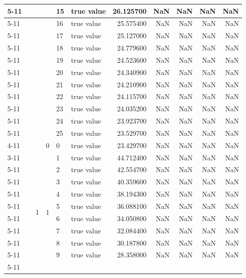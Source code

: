 \begin{tabular}{llllllrrrrr}
\cline{5-11}
 &  &  &  & 15 & true value & 26.125700 & NaN & NaN & NaN & NaN \\
\cline{5-11}
 &  &  &  & 16 & true value & 25.575400 & NaN & NaN & NaN & NaN \\
\cline{5-11}
 &  &  &  & 17 & true value & 25.127000 & NaN & NaN & NaN & NaN \\
\cline{5-11}
 &  &  &  & 18 & true value & 24.779600 & NaN & NaN & NaN & NaN \\
\cline{5-11}
 &  &  &  & 19 & true value & 24.523600 & NaN & NaN & NaN & NaN \\
\cline{5-11}
 &  &  &  & 20 & true value & 24.340900 & NaN & NaN & NaN & NaN \\
\cline{5-11}
 &  &  &  & 21 & true value & 24.210900 & NaN & NaN & NaN & NaN \\
\cline{5-11}
 &  &  &  & 22 & true value & 24.115700 & NaN & NaN & NaN & NaN \\
\cline{5-11}
 &  &  &  & 23 & true value & 24.035200 & NaN & NaN & NaN & NaN \\
\cline{5-11}
 &  &  &  & 24 & true value & 23.923700 & NaN & NaN & NaN & NaN \\
\cline{5-11}
 &  &  &  & 25 & true value & 23.529700 & NaN & NaN & NaN & NaN \\
\cline{4-11} \cline{5-11}
 &  &  & 0 & 0 & true value & 23.429700 & NaN & NaN & NaN & NaN \\
\cline{3-11} \cline{4-11} \cline{5-11}
 &  & \multirow[t]{101}{*}{1} & \multirow[t]{25}{*}{1} & 1 & true value & 44.712400 & NaN & NaN & NaN & NaN \\
\cline{5-11}
 &  &  &  & 2 & true value & 42.554700 & NaN & NaN & NaN & NaN \\
\cline{5-11}
 &  &  &  & 3 & true value & 40.359600 & NaN & NaN & NaN & NaN \\
\cline{5-11}
 &  &  &  & 4 & true value & 38.194300 & NaN & NaN & NaN & NaN \\
\cline{5-11}
 &  &  &  & 5 & true value & 36.088100 & NaN & NaN & NaN & NaN \\
\cline{5-11}
 &  &  &  & 6 & true value & 34.050800 & NaN & NaN & NaN & NaN \\
\cline{5-11}
 &  &  &  & 7 & true value & 32.084400 & NaN & NaN & NaN & NaN \\
\cline{5-11}
 &  &  &  & 8 & true value & 30.187800 & NaN & NaN & NaN & NaN \\
\cline{5-11}
 &  &  &  & 9 & true value & 28.358000 & NaN & NaN & NaN & NaN \\
\cline{5-11}

\end{tabular}
